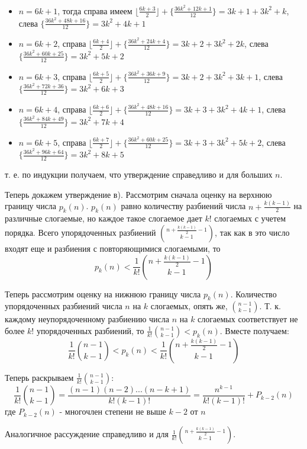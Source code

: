 \documentclass[a4paper,12pt]{article}
\begin{document}
\begin{Solution}
\begin{itemize}
\item $n=6k+1$, тогда справа имеем $\lfloor \frac{6k + 3}{2} \rfloor + \{\frac{36 k^2 + 12k + 1}{12}\} = 3k + 1 + 3 k^2 + k$, слева $\{\frac{36 k^2 + 48 k + 16}{12}\} = 3 k^2 + 4k + 1$

\item $n=6k+2$, справа $\lfloor \frac{6k + 4}{2} \rfloor + \{\frac{36 k^2 + 24 k + 4}{12}\} = 3k + 2 + 3 k^2 + 2k$, слева $\{\frac{36 k^2 + 60 k + 25}{12}\} = 3 k^2 + 5k + 2$

\item $n=6k+3$, справа $\lfloor \frac{6k + 5}{2} \rfloor + \{\frac{36 k^2 + 36 k + 9}{12}\} = 3k + 2 + 3 k^2 + 3 k + 1$, слева $\{\frac{36 k^2 + 72 k + 36}{12}\} = 3 k^2 + 6 k + 3$

\item $n=6k+4$, справа $\lfloor \frac{6k + 6}{2} \rfloor + \{\frac{36 k^2 + 48 k + 16}{12}\} = 3k + 3 + 3 k^2 + 4k + 1$, слева $\{\frac{36 k^2 + 84 k + 49}{12}\} = 3 k^2 + 7 k + 4$

\item $n=6k+5$, справа $\lfloor \frac{6k + 7}{2} \rfloor + \{\frac{36 k^2 + 60 k + 25}{12}\} = 3k + 3 + 3 k^2 + 5 k + 2$, слева $\{\frac{36 k^2 + 96 k + 64}{12}\} = 3 k^2 + 8 k + 5$
\end{itemize}
т. е. по индукции получаем, что утверждение справедливо и для больших $n$.

Теперь докажем утверждение в). Рассмотрим сначала оценку на верхнюю границу числа $p_k\left(n\right)$. $p_k\left(n\right)$ равно количеству разбиений числа $n + \frac{k\left(k-1\right)}{2}$ на различные слогаемые, но каждое такое слогаемое дает $k!$ слогаемых с учетем порядка. Всего упорядоченных разбиений $\binom{n+\frac{k\left(k-1\right)}{2} - 1}{k-1}$, так как в это число входят еще и разбиения с повторяющимися слогаемыми, то
\[
	p_k\left(n\right) < \frac{1}{k!} \binom{n+\frac{k\left(k-1\right)}{2} - 1}{k-1}
\]

Теперь рассмотрим оценку на нижнюю границу числа $p_k\left(n\right)$. Количество упорядоченных разбиений числа $n$ на $k$ слогаемых, опять же, $\binom{n-1}{k-1}$. Т. к. каждому неупорядоченному разбиению числа $n$ на $k$ слогаемых соответствует не более $k!$ упорядоченных разбиений, то $\frac{1}{k!} \binom{n-1}{k-1} < p_k\left(n\right)$. Вместе получаем:
\[
	\frac{1}{k!} \binom{n-1}{k-1} < p_k\left(n\right) < \frac{1}{k!} \binom{n + \frac{k\left(k-1\right)}{2} -1}{k-1}
\]

Теперь раскрываем $\frac{1}{k!}\binom{n - 1}{k - 1}$:
\[
	\frac{1}{k!} \binom{n-1}{k-1} = \frac{\left(n-1\right)\left(n-2\right)...\left(n-k+1\right)}{k!\left(k-1\right)!} = \frac{n^{k-1}}{k!\left(k-1\right)!} + P_{k-2}\left(n\right)
\]
где $P_{k-2}\left(n\right)$ - многочлен степени не выше $k-2$ от $n$

Аналогичное рассуждение справедливо и для $\frac{1}{k!} \binom{n+\frac{k\left(k-1\right)}{2}-1}{k-1}$.
\end{Solution}
\end{document}
